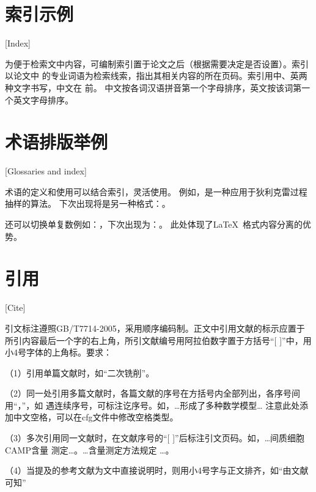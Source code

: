 \section{索引示例}[Index]

为便于检索文中内容，可编制索引置于论文之后（根据需要决定是否设置）。索引以论文中
的专业词语为检索线索，指出其相关内容的所在页码。索引用中、英两种文字书写，中文在
前。
中文按各词汉语拼音第一个字母排序，英文按该词第一个英文字母排序。

\section{术语排版举例}[Glossaries and index]

术语的定义和使用可以结合索引，灵活使用。
例如，\gtssbp 是一种应用于狄利克雷过程抽样的算法。
下次出现将是另一种格式：\gtssbp 。

还可以切换单复数例如：\gscnas ，下次出现为：\gscnas 。
此处体现了\LaTeX\ 格式内容分离的优势。

\section{引用}[Cite]

引文标注遵照GB/T7714-2005，采用顺序编码制。正文中引用文献的标示应置于所引内容最后一个字的右上角，所引文献编号用阿拉伯数字置于方括号“[ ]”中，用小4号字体的上角标。要求：

（1）引用单篇文献时，如“二次铣削\cite{cnproceed}”。

（2）同一处引用多篇文献时，各篇文献的序号在方括号内全部列出，各序号间用“，”，如
遇连续序号，可标注讫序号。如，…形成了多种数学模型\cite{cnarticle,cnproceed}…
注意此处添加中文空格，可以在cfg文件中修改空格类型。

（3）多次引用同一文献时，在文献序号的“[ ]”后标注引文页码。如，…间质细胞CAMP含量
测定\cite[100-197]{cnarticle}…。…含量测定方法规定
\cite[92]{cnarticle}…。

（4）当提及的参考文献为文中直接说明时，则用小4号字与正文排齐，如“由文献可知”


